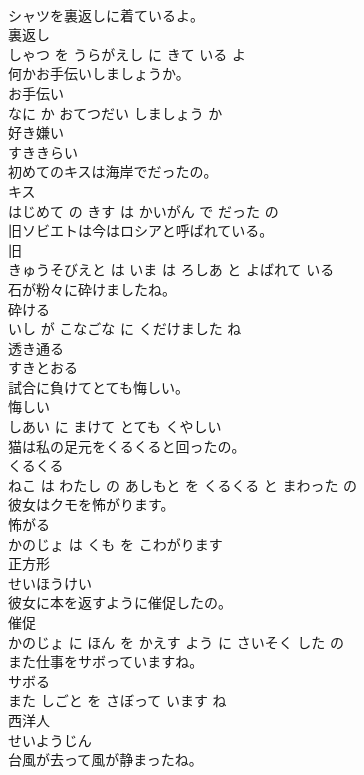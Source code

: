 \documentclass[8pt]{extreport}
\begin{document}
\begin{CJK}{UTF8}{min}
\\	シャツを裏返しに着ているよ。	
\\	裏返し 
\\	しゃつ を うらがえし に きて いる よ			
\\	何かお手伝いしましょうか。	
\\	お手伝い 
\\	なに か おてつだい しましょう か			
\\	好き嫌い	
\\	すききらい			
\\	初めてのキスは海岸でだったの。	
\\	キス 
\\	はじめて の きす は かいがん で だった の			
\\	旧ソビエトは今はロシアと呼ばれている。	
\\	旧 
\\	きゅうそびえと は いま は ろしあ と よばれて いる			
\\	石が粉々に砕けましたね。	
\\	砕ける 
\\	いし が こなごな に くだけました ね			
\\	透き通る	
\\	すきとおる			
\\	試合に負けてとても悔しい。	
\\	悔しい 
\\	しあい に まけて とても くやしい			
\\	猫は私の足元をくるくると回ったの。	
\\	くるくる 
\\	ねこ は わたし の あしもと を くるくる と まわった の			
\\	彼女はクモを怖がります。	
\\	怖がる 
\\	かのじょ は くも を こわがります			
\\	正方形	
\\	せいほうけい			
\\	彼女に本を返すように催促したの。	
\\	催促 
\\	かのじょ に ほん を かえす よう に さいそく した の			
\\	また仕事をサボっていますね。	
\\	サボる 
\\	また しごと を さぼって います ね			
\\	西洋人	
\\	せいようじん			
\\	台風が去って風が静まったね。	

\end{CJK}
\end{document}
